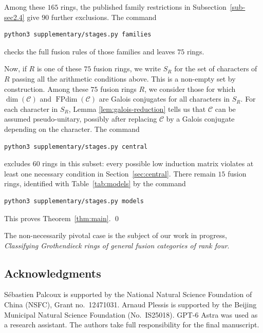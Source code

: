 \documentclass[11pt]{amsart}
\theoremstyle{definition}
\DeclareMathOperator{\FPdim}{FPdim}
\numberwithin{equation}{section}
\begin{document}
Among these $165$ rings, the published family restrictions in
Subsection~\ref{sub-sec2.4} give $90$ further exclusions. The command
\begin{verbatim}
python3 supplementary/stages.py families
\end{verbatim}
checks the full fusion rules of those families and leaves $75$ rings.

Now, if $R$ is one of these $75$ fusion rings, we write $S_R$ for the set of characters of $R$ passing all the arithmetic conditions above. 
This is a non-empty set by construction. 
Among these $75$ fusion rings $R$, we consider those for which $\dim(\mathcal{C})$ and $\FPdim(\mathcal{C})$ are Galois conjugates for all characters in $S_R$. 
For each character in $S_R$, Lemma \ref{lem:galois-reduction} tells us that $\mathcal{C}$ can be assumed pseudo-unitary, possibly after replacing $\mathcal{C}$ by a Galois conjugate depending on the character.
The command 
\begin{verbatim}
python3 supplementary/stages.py central
\end{verbatim}
excludes $60$ rings in this subset: every possible low induction matrix violates at least one necessary condition in Section~\ref{sec:central}.
There remain $15$ fusion rings, identified with Table~\ref{tab:models} by the command
\begin{verbatim}
python3 supplementary/stages.py models
\end{verbatim}
This proves Theorem~\ref{thm:main}. \qed


\par\smallskip
The non-necessarily pivotal case is the subject of our work
in progress, \emph{Classifying Grothendieck rings of general fusion
categories of rank four}.

\subsection*{Acknowledgments}
S\'ebastien Palcoux is supported by the National Natural Science
Foundation of China (NSFC), Grant no.~12471031.
Arnaud Plessis is supported by the Beijing Municipal Natural Science
Foundation (No.~IS25018).
GPT-6 Astra was used as a research assistant. The authors take full
responsibility for the final manuscript.
\end{document}
